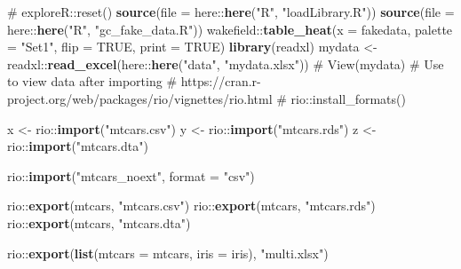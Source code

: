 \documentclass[
]{article}
\newenvironment{Shaded}{\begin{snugshade}}{\end{snugshade}}
\newcommand{\CommentTok}[1]{\textcolor[rgb]{0.54,0.53,0.53}{#1}}
\newcommand{\DataTypeTok}[1]{\textcolor[rgb]{0.00,0.34,0.68}{#1}}
\newcommand{\KeywordTok}[1]{\textcolor[rgb]{0.12,0.11,0.11}{\textbf{#1}}}
\newcommand{\NormalTok}[1]{\textcolor[rgb]{0.12,0.11,0.11}{#1}}
\newcommand{\OperatorTok}[1]{\textcolor[rgb]{0.12,0.11,0.11}{#1}}
\newcommand{\OtherTok}[1]{\textcolor[rgb]{0.00,0.43,0.16}{#1}}
\newcommand{\StringTok}[1]{\textcolor[rgb]{0.75,0.01,0.01}{#1}}
\begin{document}
\begin{Shaded}
\begin{Highlighting}[]
{{\CommentTok{# exploreR::reset()}
\KeywordTok{source}\NormalTok{(}\DataTypeTok{file =}\NormalTok{ here}\OperatorTok{::}\KeywordTok{here}\NormalTok{(}\StringTok{"R"}\NormalTok{, }\StringTok{"loadLibrary.R"}\NormalTok{))}
\KeywordTok{source}\NormalTok{(}\DataTypeTok{file =}\NormalTok{ here}\OperatorTok{::}\KeywordTok{here}\NormalTok{(}\StringTok{"R"}\NormalTok{, }\StringTok{"gc_fake_data.R"}\NormalTok{))}
\NormalTok{wakefield}\OperatorTok{::}\KeywordTok{table_heat}\NormalTok{(}\DataTypeTok{x =}\NormalTok{ fakedata, }\DataTypeTok{palette =} \StringTok{"Set1"}\NormalTok{, }\DataTypeTok{flip =} \OtherTok{TRUE}\NormalTok{, }\DataTypeTok{print =} \OtherTok{TRUE}\NormalTok{)}
\KeywordTok{library}\NormalTok{(readxl)}
\NormalTok{mydata <-}\StringTok{ }\NormalTok{readxl}\OperatorTok{::}\KeywordTok{read_excel}\NormalTok{(here}\OperatorTok{::}\KeywordTok{here}\NormalTok{(}\StringTok{"data"}\NormalTok{, }\StringTok{"mydata.xlsx"}\NormalTok{))}
\CommentTok{# View(mydata) # Use to view data after importing}
\CommentTok{# https://cran.r-project.org/web/packages/rio/vignettes/rio.html}
\CommentTok{# rio::install_formats()}

\NormalTok{x <-}\StringTok{ }\NormalTok{rio}\OperatorTok{::}\KeywordTok{import}\NormalTok{(}\StringTok{"mtcars.csv"}\NormalTok{)}
\NormalTok{y <-}\StringTok{ }\NormalTok{rio}\OperatorTok{::}\KeywordTok{import}\NormalTok{(}\StringTok{"mtcars.rds"}\NormalTok{)}
\NormalTok{z <-}\StringTok{ }\NormalTok{rio}\OperatorTok{::}\KeywordTok{import}\NormalTok{(}\StringTok{"mtcars.dta"}\NormalTok{)}

\NormalTok{rio}\OperatorTok{::}\KeywordTok{import}\NormalTok{(}\StringTok{"mtcars_noext"}\NormalTok{, }\DataTypeTok{format =} \StringTok{"csv"}\NormalTok{)}

\NormalTok{rio}\OperatorTok{::}\KeywordTok{export}\NormalTok{(mtcars, }\StringTok{"mtcars.csv"}\NormalTok{)}
\NormalTok{rio}\OperatorTok{::}\KeywordTok{export}\NormalTok{(mtcars, }\StringTok{"mtcars.rds"}\NormalTok{)}
\NormalTok{rio}\OperatorTok{::}\KeywordTok{export}\NormalTok{(mtcars, }\StringTok{"mtcars.dta"}\NormalTok{)}

\NormalTok{rio}\OperatorTok{::}\KeywordTok{export}\NormalTok{(}\KeywordTok{list}\NormalTok{(}\DataTypeTok{mtcars =}\NormalTok{ mtcars, }\DataTypeTok{iris =}\NormalTok{ iris), }\StringTok{"multi.xlsx"}\NormalTok{)}

}}
\end{Highlighting}
\end{Shaded}
\end{document}
